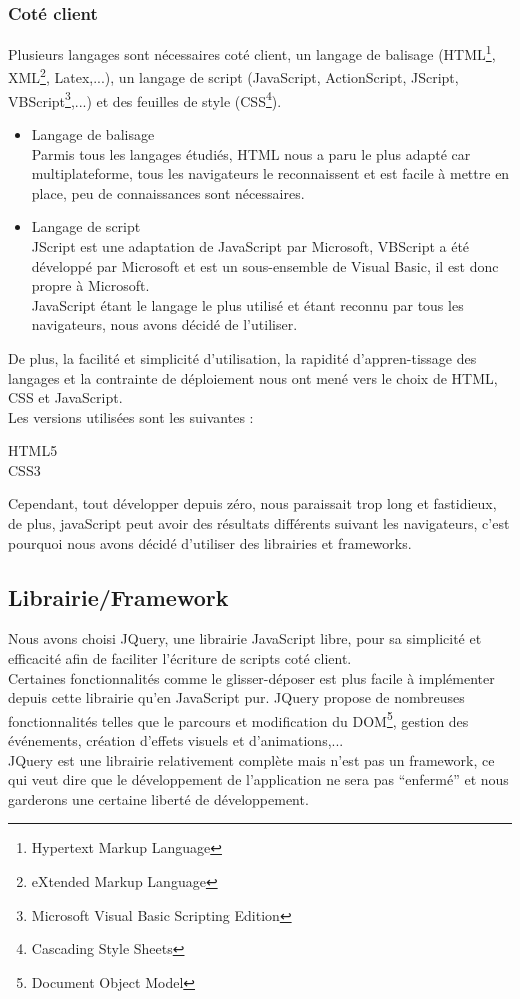 \documentclass{sigplanconf}
\begin{document}
\subsubsection{Coté client}\label{langagesClient}
Plusieurs langages sont nécessaires coté client, un langage de balisage (HTML\footnote{Hypertext Markup Language}, XML\footnote{eXtended Markup Language}, Latex,...), un langage de script (JavaScript, ActionScript, JScript, VBScript\footnote{Microsoft Visual Basic Scripting Edition},...) et des feuilles de style (CSS\footnote{Cascading Style Sheets}).
\begin{itemize}
\item Langage de balisage\\
Parmis tous les langages étudiés, HTML nous a paru le plus adapté car multiplateforme, tous les navigateurs le reconnaissent et est facile à mettre en place, peu de connaissances sont nécessaires.
\item Langage de script\\
JScript est une adaptation de JavaScript par Microsoft, VBScript a été développé par Microsoft et est un sous-ensemble de Visual Basic, il est donc propre à Microsoft.\\
JavaScript étant le langage le plus utilisé et étant reconnu par tous les navigateurs, nous avons décidé de l'utiliser.
\end{itemize}

De plus, la facilité et simplicité d'utilisation, la rapidité d'appren-tissage des langages et la contrainte de déploiement nous ont mené vers le choix de HTML, CSS et JavaScript.\\
Les versions utilisées sont les suivantes :
\begin{description}
\item [HTML5]
\item [CSS3]
\end{description}

Cependant, tout développer depuis zéro, nous paraissait trop long et fastidieux, de plus, javaScript peut avoir des résultats différents suivant les navigateurs, c'est pourquoi nous avons décidé d'utiliser des librairies et frameworks.

\subsection{Librairie/Framework}\label{librairieFramework}
Nous avons choisi JQuery\cite{urljQuery}, une librairie JavaScript libre, pour sa simplicité et efficacité afin de faciliter l'écriture de scripts coté client.\\
Certaines fonctionnalités comme le glisser-déposer est plus facile à implémenter depuis cette librairie qu’en JavaScript pur. JQuery propose de nombreuses fonctionnalités telles que le parcours et modification du DOM\footnote{Document Object Model}, gestion des événements, création d'effets visuels et d'animations,...\\
JQuery est une librairie relativement complète mais n'est pas un framework, ce qui veut dire que le développement de l'application ne sera pas ``enfermé'' et nous garderons une certaine liberté de développement.\\
\end{document}
